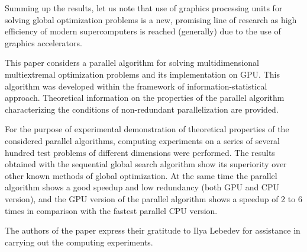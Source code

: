 \documentclass[smallcondensed]{svjour3}     %
\begin{document}
Summing up the results, let us note that use of graphics processing units for solving global optimization problems is a new, promising line of research as high efficiency of modern supercomputers is reached (generally) due to the use of graphics accelerators. 

This paper considers a parallel algorithm for solving multidimensional multiextremal optimization problems and its implementation on GPU. This algorithm was developed within the framework of information-statistical approach. Theoretical information on the properties of the parallel algorithm characterizing the conditions of non-redundant parallelization are provided.

For the purpose of experimental demonstration of theoretical properties of the considered parallel algorithms, computing experiments on a series of several hundred test problems of different dimensions were performed. The results obtained with the sequential global search algorithm show its superiority over other known methods of global optimization. At the same time the parallel algorithm shows a good speedup and low redundancy (both GPU and CPU version), and the GPU version of the parallel algorithm shows a speedup of 2 to 6 times in comparison with the fastest parallel CPU version.

\begin{acknowledgements}

The authors of the paper express their gratitude to Ilya Lebedev for assistance in carrying out the computing experiments.

\end{acknowledgements}

\end{document}

